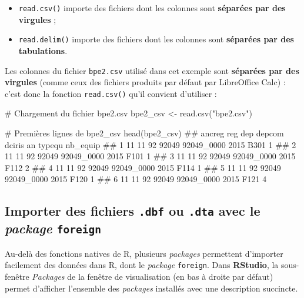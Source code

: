 \documentclass[12pt,twosided, notitlepage]{book}
\newenvironment{Shaded}{}{}
\newcommand{\KeywordTok}[1]{\textcolor[rgb]{0.00,0.00,1.00}{{#1}}}
\newcommand{\StringTok}[1]{\textcolor[rgb]{0.00,0.50,0.50}{{#1}}}
\newcommand{\CommentTok}[1]{\textcolor[rgb]{0.00,0.50,0.00}{{#1}}}
\newcommand{\NormalTok}[1]{{#1}}
\providecommand{\tightlist}{%
  \setlength{\itemsep}{0pt}\setlength{\parskip}{0pt}}
\renewenvironment{Shaded}{\begin{snugshade}}{\end{snugshade}}
\begin{document}
\begin{itemize}
\tightlist
\item
  \texttt{read.csv()} importe des
  fichiers dont les colonnes sont \textbf{séparées par des virgules} ;
\item
  \texttt{read.delim()} importe des
  fichiers dont les colonnes sont \textbf{séparées par des tabulations}.
\end{itemize}

Les colonnes du fichier \texttt{bpe2.csv} utilisé dans cet exemple sont
\textbf{séparées par des virgules} (comme ceux des fichiers produits par
défaut par LibreOffice Calc) : c'est donc la fonction
\texttt{read.csv()} qu'il convient d'utiliser :

\begin{Shaded}
\begin{Highlighting}[]
\CommentTok{# Chargement du fichier bpe2.csv}
\NormalTok{bpe2_csv <-}\StringTok{ }\KeywordTok{read.csv}\NormalTok{(}\StringTok{"bpe2.csv"}\NormalTok{)}

\CommentTok{# Premières lignes de bpe2_csv}
\KeywordTok{head}\NormalTok{(bpe2_csv)}
  \NormalTok{##   ancreg reg dep depcom     dciris   an typequ nb_equip}
  \NormalTok{## 1     11  11  92  92049 92049_0000 2015   B301        1}
  \NormalTok{## 2     11  11  92  92049 92049_0000 2015   F101        1}
  \NormalTok{## 3     11  11  92  92049 92049_0000 2015   F112        2}
  \NormalTok{## 4     11  11  92  92049 92049_0000 2015   F114        1}
  \NormalTok{## 5     11  11  92  92049 92049_0000 2015   F120        1}
  \NormalTok{## 6     11  11  92  92049 92049_0000 2015   F121        4}
\end{Highlighting}
\end{Shaded}

\subsection{\texorpdfstring{Importer des fichiers \texttt{.dbf} ou
\texttt{.dta} avec le \emph{package}
\texttt{foreign}}{Importer des fichiers .dbf ou .dta avec le package foreign}}\label{importer-des-fichiers-.dbf-ou-.dta-avec-le-package-foreign}

Au-delà des fonctions natives de R, plusieurs \emph{packages} permettent
d'importer facilement des données dans R, dont le \emph{package}
\texttt{foreign}. Dans \textbf{RStudio}, la sous-fenêtre \emph{Packages}
de la fenêtre de visualisation (en bas à droite par défaut) permet
d'afficher l'ensemble des \emph{packages} installés avec une description
succincte.
\end{document}
